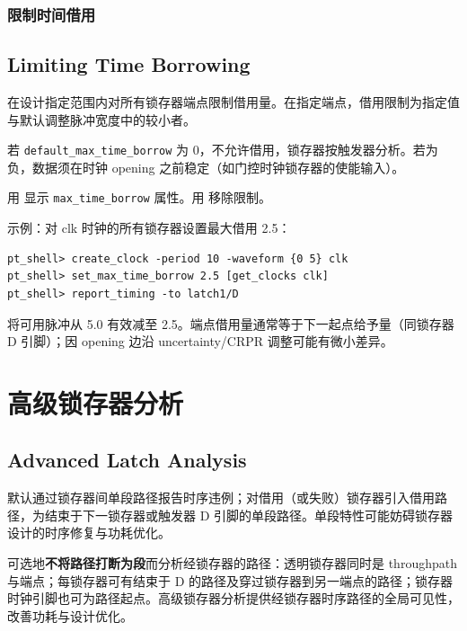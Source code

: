 \subsubsection{限制时间借用}
\subsection*{Limiting Time Borrowing}

 在设计指定范围内对所有锁存器端点限制借用量。在指定端点，借用限制为指定值与默认调整脉冲宽度中的较小者。

若 \texttt{default\_max\_time\_borrow} 为 0，不允许借用，锁存器按触发器分析。若为负，数据须在时钟 opening 之前稳定（如门控时钟锁存器的使能输入）。

用  显示 \texttt{max\_time\_borrow} 属性。用  移除限制。

示例：对 clk 时钟的所有锁存器设置最大借用 2.5：
\begin{lstlisting}
pt_shell> create_clock -period 10 -waveform {0 5} clk
pt_shell> set_max_time_borrow 2.5 [get_clocks clk]
pt_shell> report_timing -to latch1/D
\end{lstlisting}

 将可用脉冲从 5.0 有效减至 2.5。端点借用量通常等于下一起点给予量（同锁存器 D 引脚）；因 opening 边沿 uncertainty/CRPR 调整可能有微小差异。

\section{高级锁存器分析}
\subsection*{Advanced Latch Analysis}

默认通过锁存器间单段路径报告时序违例；对借用（或失败）锁存器引入借用路径，为结束于下一锁存器或触发器 D 引脚的单段路径。单段特性可能妨碍锁存器设计的时序修复与功耗优化。

可选地\textbf{不将路径打断为段}而分析经锁存器的路径：透明锁存器同时是 throughpath 与端点；每锁存器可有结束于 D 的路径及穿过锁存器到另一端点的路径；锁存器时钟引脚也可为路径起点。高级锁存器分析提供经锁存器时序路径的全局可见性，改善功耗与设计优化。

